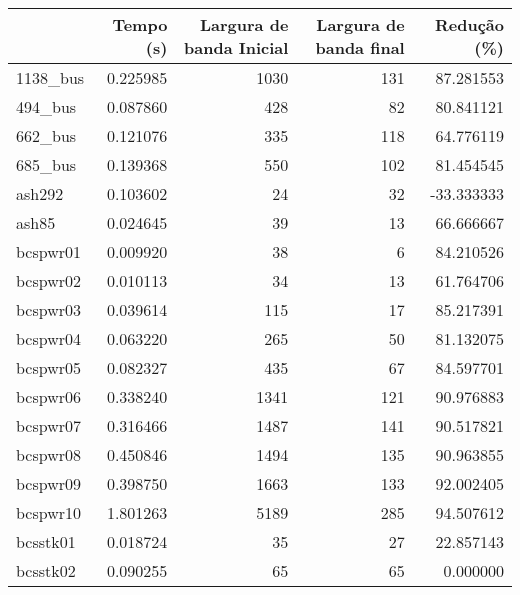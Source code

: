  \begin{tabular}{lrrrr}
\toprule
{} &  Tempo (s) &  Largura de banda Inicial &  Largura de banda final &  Redução (\%) \\
\midrule
1138_bus &   0.225985 &                      1030 &                     131 &    87.281553 \\
494_bus  &   0.087860 &                       428 &                      82 &    80.841121 \\
662_bus  &   0.121076 &                       335 &                     118 &    64.776119 \\
685_bus  &   0.139368 &                       550 &                     102 &    81.454545 \\
ash292   &   0.103602 &                        24 &                      32 &   -33.333333 \\
ash85    &   0.024645 &                        39 &                      13 &    66.666667 \\
bcspwr01 &   0.009920 &                        38 &                       6 &    84.210526 \\
bcspwr02 &   0.010113 &                        34 &                      13 &    61.764706 \\
bcspwr03 &   0.039614 &                       115 &                      17 &    85.217391 \\
bcspwr04 &   0.063220 &                       265 &                      50 &    81.132075 \\
bcspwr05 &   0.082327 &                       435 &                      67 &    84.597701 \\
bcspwr06 &   0.338240 &                      1341 &                     121 &    90.976883 \\
bcspwr07 &   0.316466 &                      1487 &                     141 &    90.517821 \\
bcspwr08 &   0.450846 &                      1494 &                     135 &    90.963855 \\
bcspwr09 &   0.398750 &                      1663 &                     133 &    92.002405 \\
bcspwr10 &   1.801263 &                      5189 &                     285 &    94.507612 \\
bcsstk01 &   0.018724 &                        35 &                      27 &    22.857143 \\
bcsstk02 &   0.090255 &                        65 &                      65 &     0.000000 \\

\end{tabular}
